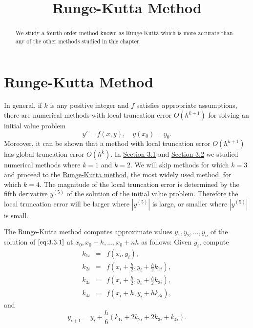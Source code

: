 \documentclass{ximera}
\title{Runge-Kutta Method}
\begin{document}

\begin{abstract}
We study a fourth order method known as Runge-Kutta which is more accurate than any of the other methods studied in this chapter.
\end{abstract}

\maketitle

\section*{Runge-Kutta Method}

In general, if $k$ is any  positive  integer  and $f$
satisfies appropriate assumptions, there are numerical methods with
local truncation error  $O(h^{k+1})$ for solving an initial value
problem
\begin{equation} \label{eq:3.3.1}
y'=f(x,y),\quad y(x_0)=y_0.
\end{equation}
Moreover, it can be shown that a method with local truncation error
$O(h^{k+1})$ has global truncation error $O(h^k)$. In
\href{https://xerxes.ximera.org/differentialequations/main/eulersMethod/eulersMethod}{Section 3.1} and \href{https://xerxes.ximera.org/differentialequations/main/improvedEuler/improvedEuler}{Section 3.2} we studied numerical
methods where
$k=1$ and $k=2$. We will skip methods for which $k=3$ and proceed to the
\href{https://en.wikipedia.org/wiki/Runge%E2%80%93Kutta_methods}{Runge-Kutta method}, the most widely used method, for which $k=4$. The magnitude of the local truncation error is
determined by the fifth derivative $y^{(5)}$ of the solution of the
initial value problem. Therefore the local truncation error will be
larger where $|y^{(5)}|$ is large, or smaller where $|y^{(5)}|$ is
small.

The Runge-Kutta method computes approximate values
$y_1, y_2, \dots, y_n$ of the solution of $\eqref{eq:3.3.1}$
at $x_0, x_0+h, \dots, x_0+nh$ as follows: Given $y_i$,
compute
\begin{eqnarray*} k_{1i}&=&f(x_i,y_i),\\
k_{2i}&=&f\left(x_i+\frac{h}{2},y_i+\frac{h}{2}k_{1i}\right),\\
k_{3i}&=&f\left(x_i+\frac{h}{2},y_i+\frac{h}{2}k_{2i}\right),\\
k_{4i}&=&f(x_i+h,y_i+hk_{3i}),
\end{eqnarray*}
and
$$
y_{i+1}=y_i+\frac{h}{6}(k_{1i}+2k_{2i}+2k_{3i}+k_{4i}).
$$
\end{document}
